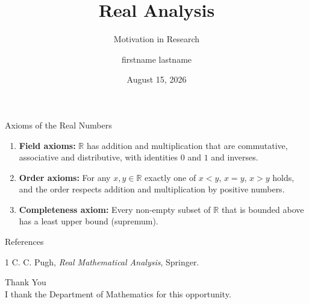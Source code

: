 \documentclass{beamer}
\title{Real Analysis}
\subtitle{Motivation in Research}
\author{firstname lastname}
\institute{Mumbai University}
\date{August 15, 2026}
\begin{document}
	
	\begin{frame}\titlepage\end{frame}
	
	\begin{frame}{Axioms of the Real Numbers}
		\begin{enumerate}
			\item \textbf{Field axioms:} $\mathbb{R}$ has addition and multiplication that are commutative, associative and distributive, with identities $0$ and $1$ and inverses.
			\item \textbf{Order axioms:} For any $x,y\in\mathbb{R}$ exactly one of $x<y$, $x=y$, $x>y$ holds, and the order respects addition and multiplication by positive numbers.
			\item \textbf{Completeness axiom:} Every non-empty subset of $\mathbb{R}$ that is bounded above has a least upper bound (supremum).
		\end{enumerate}
	\end{frame}
	
	\begin{frame}{References}
		\begin{thebibliography}{1}
			 C. C. Pugh, \emph{Real Mathematical Analysis}, Springer.
		\end{thebibliography}
	\end{frame}
	
	\begin{frame}
		\centering
		{\Huge Thank You}\\[5mm]
		I thank the Department of Mathematics for this opportunity.
	\end{frame}
	
\end{document}
